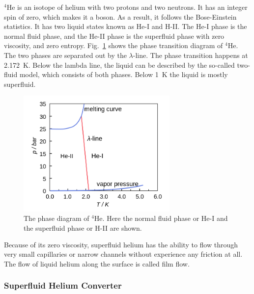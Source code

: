 $^4$He is an isotope of helium with two protons and two neutrons. It
has an integer spin of zero, which makes it a boson. As a result, it
follows the Bose-Einstein statistics. It has two liquid states known
as He-I and H-II. The He-I phase is the normal fluid phase, and the
He-II phase is the superfluid phase with zero viscosity, and zero
entropy. Fig.~\ref{fig:phasetransition} shows the phase transition
diagram of $^4$He. The two phases are separated out by the
$\lambda$-line. The phase transition happens at 2.172~K.  Below the
lambda line, the liquid can be described by the so-called two-fluid
model, which consists of both phases. Below 1~K the liquid is mostly
superfluid.

\begin{figure}[h!]
  \centering \includegraphics[width=0.7\textwidth]{phasetransition.png}
  \caption{The phase diagram of $^4$He. Here the normal fluid phase or
    He-I and the superfluid phase or H-II are shown.}
\label{fig:phasetransition}
\end{figure}

Because of its zero viscosity, superfluid helium has the ability to
flow through very small capillaries or narrow channels without
experience any friction at all. The flow of liquid helium along the
surface is called film flow.


\subsubsection{Superfluid Helium Converter}

